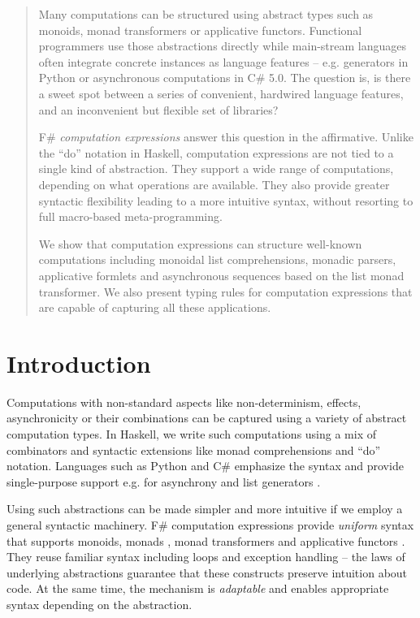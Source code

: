 \documentclass[runningheads,a4paper]{llncs}
\begin{document}
\begin{abstract}
Many computations can be structured using abstract types such as monoids, monad transformers or 
applicative functors. Functional programmers use those abstractions directly while main-stream
languages often integrate concrete instances as language features -- e.g. generators in Python
or asynchronous computations in C\# 5.0. The question is, is there a sweet spot between a series of
convenient, hardwired language features, and an inconvenient but flexible set of libraries?

\quad F\# \emph{computation expressions} answer this question in the affirmative. Unlike 
the ``do'' notation in Haskell, computation expressions are not tied to a single kind of abstraction.
They support a wide range of computations, depending on what operations are available. They also 
provide greater syntactic flexibility leading to a more intuitive syntax, without resorting to 
full macro-based meta-programming. 

\quad We show that computation expressions can structure well-known computations including monoidal 
list comprehensions, monadic parsers, applicative formlets and asynchronous sequences based on the 
list monad transformer. We also present typing rules for computation expressions that are capable of 
capturing all these applications. 

\end{abstract}


\section{Introduction}
Computations with non-standard aspects like non-determinism, effects, asynchronicity or their
combinations can be captured using a variety of abstract computation types. In Haskell, we write 
such computations using a mix of combinators and syntactic extensions like monad comprehensions 
\cite{monad-compre} and ``do'' notation. Languages such as Python and C\# emphasize the syntax 
and provide single-purpose support e.g. for asynchrony \cite{cs-async} and list generators
\cite{csharp-iterators}. 

Using such abstractions can be made simpler and more intuitive 
if we employ a general syntactic machinery. F\# computation expressions provide
\emph{uniform} syntax that supports monoids, monads \cite{monads-fp}, monad transformers 
\cite{monad-transformers} and applicative functors \cite{applicative}. They reuse familiar 
syntax including loops and exception handling -- the laws of underlying
abstractions guarantee that these constructs preserve intuition about code. At the same time, 
the mechanism is \emph{adaptable} and enables appropriate syntax depending on the abstraction.
\end{document}
